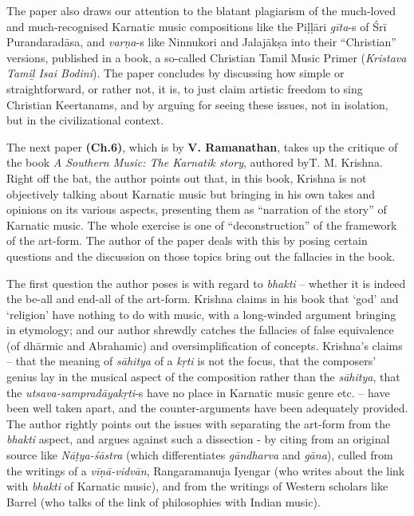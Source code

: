 The paper also draws our attention to the blatant plagiarism of the much-loved and much-recognised Karnatic music compositions like the Piḷḷāri \textit{gīta}-s of Śrī Purandaradāsa, and \textit{varṇa}-s like Ninnukori and Jalajākṣa into their “Christian” versions, published in a book, a so-called Christian Tamil Music Primer (\textit{Kristava Tamiḻ Isai Bodini}). The paper concludes by discussing how simple or straightforward, or rather not, it is, to just claim artistic freedom to sing Christian Keertanams, and by arguing for seeing these issues, not in isolation, but in the civilizational context.

The next paper \textbf{(Ch.6)}, which is by \textbf{V. Ramanathan}, takes up the critique of the book \textit{A Southern Music: The Karnatik story}, authored by\break T. M. Krishna. Right off the bat, the author points out that, in this book, Krishna is not objectively talking about Karnatic music but bringing in his own takes and opinions on its various aspects, presenting them as “narration of the story” of Karnatic music. The whole exercise is one of “deconstruction” of the framework of the art-form. The author of the paper deals with this by posing certain questions and the discussion on those topics bring out the fallacies in the book.

The first question the author poses is with regard to \textit{bhakti} – whether it is indeed the be-all and end-all of the art-form. Krishna claims in his book that ‘god’ and ‘religion’ have nothing to do with music, with a long-winded argument bringing in etymology; and our author shrewdly catches the fallacies of false equivalence (of dhārmic and Abrahamic) and oversimplification of concepts. Krishna’s claims – that the meaning of \textit{sāhitya} of a \textit{kṛti} is not the focus, that the composers’ genius lay in the musical aspect of the composition rather than the \textit{sāhitya}, that the \textit{utsava-sampradāyakṛti}-s have no place in Karnatic music genre etc. – have been well taken apart, and the counter-arguments have been adequately provided. The author rightly points out the issues with separating the art-form from the \textit{bhakti} aspect, and argues against such a dissection - by citing from an original source like \textit{Nāṭya-śāstra} (which differentiates \textit{gāndharva} and \textit{gāna}), culled from the writings of a \textit{vīṇā-vidvān}, Rangaramanuja Iyengar (who writes about the link with \textit{bhakti} of Karnatic music), and from the writings of Western scholars like Barrel (who talks of the link of philosophies with Indian music).

